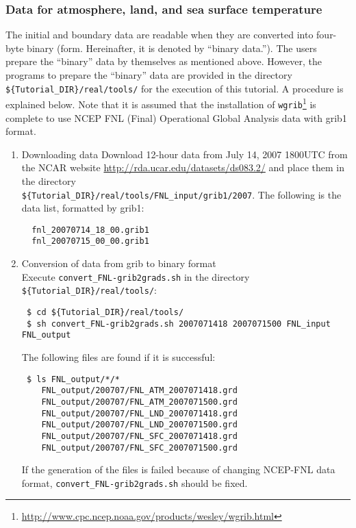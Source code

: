 \subsubsection{Data for atmosphere, land, and sea surface temperature}

The initial and boundary data are readable
when they are converted into four-byte binary (\grads form. Hereinafter, it is denoted by ``binary data.'').
The users prepare the ``binary'' data by themselves as mentioned above.
However, 
the programs to prepare the ``binary'' data are provided in the directory \\
\verb|${Tutorial_DIR}/real/tools/| for the execution of this tutorial.
A procedure is explained below.
Note that it is assumed that the installation
of \verb|wgrib|\footnote{\url{http://www.cpc.ncep.noaa.gov/products/wesley/wgrib.html}} is complete
to use NCEP FNL (Final) Operational Global Analysis data with grib1 format.


\begin{enumerate}
\item Downloading data
Download 12-hour data from July 14, 2007 1800UTC from the NCAR website \url{http://rda.ucar.edu/datasets/ds083.2/}
and place them in the directory \\ 
\verb|${Tutorial_DIR}/real/tools/FNL_input/grib1/2007|.
The following is the data list, formatted by grib1:
\begin{verbatim}
  fnl_20070714_18_00.grib1
  fnl_20070715_00_00.grib1
\end{verbatim}
\item Conversion of data from grib to binary format\\
Execute \verb|convert_FNL-grib2grads.sh| in the directory \verb|${Tutorial_DIR}/real/tools/|:
\begin{verbatim}
 $ cd ${Tutorial_DIR}/real/tools/
 $ sh convert_FNL-grib2grads.sh 2007071418 2007071500 FNL_input FNL_output
\end{verbatim}
The following files are found if it is successful:
\begin{verbatim}
 $ ls FNL_output/*/*
    FNL_output/200707/FNL_ATM_2007071418.grd
    FNL_output/200707/FNL_ATM_2007071500.grd
    FNL_output/200707/FNL_LND_2007071418.grd
    FNL_output/200707/FNL_LND_2007071500.grd
    FNL_output/200707/FNL_SFC_2007071418.grd
    FNL_output/200707/FNL_SFC_2007071500.grd
\end{verbatim}
If the generation of the files is failed because of changing NCEP-FNL data format,
\verb|convert_FNL-grib2grads.sh| should be fixed.
\end{enumerate}
